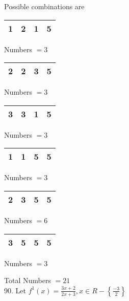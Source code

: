 \documentclass[10pt]{article}
\begin{document}
Possible combinations are

\begin{center}
\begin{tabular}{|l|l|l|l|}
\hline
1 & 2 & 1 & 5 \\
\hline
\end{tabular}
\end{center}

Numbers \(=3\)

\begin{center}
\begin{tabular}{|l|l|l|l|}
\hline
2 & 2 & 3 & 5 \\
\hline
\end{tabular}
\end{center}

Numbers \(=3\)

\begin{center}
\begin{tabular}{|l|l|l|l|}
\hline
3 & 3 & 1 & 5 \\
\hline
\end{tabular}
\end{center}

Numbers \(=3\)

\begin{center}
\begin{tabular}{|l|l|l|l|}
\hline
1 & 1 & 5 & 5 \\
\hline
\end{tabular}
\end{center}

Numbers \(=3\)

\begin{center}
\begin{tabular}{|l|l|l|l|}
\hline
2 & 3 & 5 & 5 \\
\hline
\end{tabular}
\end{center}

Numbers \(=6\)

\begin{center}
\begin{tabular}{|l|l|l|l|}
\hline
3 & 5 & 5 & 5 \\
\hline
\end{tabular}
\end{center}

Numbers \(=3\)

Total Numbers \(=21\)\\
90. Let \(f^{1}(x)=\frac{3 x+2}{2 x+3}, x \in R-\left\{\frac{-3}{2}\right\}\)
\end{document}
